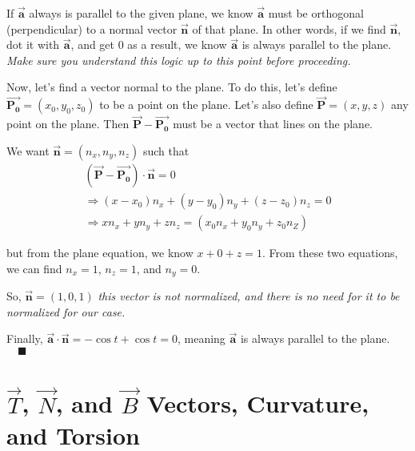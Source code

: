 \documentclass[letterpaper, 11pt]{article}
\begin{document}
\begin{enumerate}
If $\vec{\bm{a}}$ always is parallel to the given plane, we know $\vec{\bm{a}}$ must be orthogonal (perpendicular) to a normal vector $\vec{\bm{n}}$ of that plane. In other words, if we find $\vec{\bm{n}}$, dot it with $\vec{\bm{a}}$, and get 0 as a result, we know $\vec{\bm{a}}$ is always parallel to the plane. \textit{Make sure you understand this logic up to this point before proceeding.}

Now, let's find a vector normal to the plane. To do this, let's define $\vec{\bm{P_0}}=(x_0,y_0,z_0)$ to be a point on the plane. Let's also define $\vec{\bm{P}}=(x,y,z)$ any point on the plane. Then $\vec{\bm{P}}-\vec{\bm{P_0}}$ must be a vector that lines on the plane. 

We want $\vec{\bm{n}}=(n_x,n_y,n_z)$ such that 
\begin{gather*}
(\vec{\bm{P}}-\vec{\bm{P_0}})\cdot \vec{\bm{n}}=0 \\ 
\Rightarrow (x-x_0)n_x+(y-y_0)n_y+(z-z_0)n_z=0 \\
\Rightarrow xn_x+yn_y+zn_z = (x_0n_x+y_0n_y+z_0n_Z)
\end{gather*}

but from the plane equation, we know $x + 0 + z = 1$. From these two equations, we can find $n_x = 1$, $n_z = 1$, and $n_y = 0$. 
\par So, $\vec{\bm{n}}=(1,0,1)$ \textit{this vector is not normalized, and there is no need for it to be normalized for our case.}
\par Finally, $\vec{\bm{a}}\cdot\vec{\bm{n}}=-\cos t + \cos t = 0$, meaning  $\vec{\bm{a}}$ is always parallel to the plane.$\quad\blacksquare$ 

\end{enumerate}

\section{$\vec T$, $\vec N$, and $\vec B$ Vectors, Curvature, and Torsion}
\end{document}
